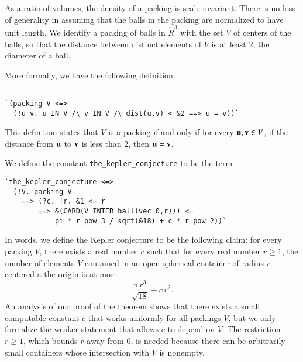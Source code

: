 As a ratio of volumes, the density of a packing is scale invariant.
There is no loss of generality in assuming that the balls in the
packing are normalized to have unit length.  We identify a packing of
balls in $\ring{R}^3$ with the set $V$ of centers of the balls, so
that the distance between distinct elements of $V$ is at least $2$,
the diameter of a ball.

More formally, we have the following definition.

\begin{obeylines}

\begin{verbatim}

`(packing V <=> 
  (!u v. u IN V /\ v IN V /\ dist(u,v) < &2 ==> u = v))`

\end{verbatim}
\end{obeylines}
This definition states that $V$ is a packing if and only if for every
${\mathbf u}, {\mathbf v} \in V$, if the distance from ${\mathbf u}$ to ${\mathbf v}$ is less than $2$,
then ${\mathbf u}={\mathbf v}$.

We define the constant {\tt the\_kepler\_conjecture} to be the term

\begin{obeylines}

\begin{verbatim}
`the_kepler_conjecture <=>
  (!V. packing V
    ==> (?c. !r. &1 <= r
        ==> &(CARD(V INTER ball(vec 0,r))) <=
            pi * r pow 3 / sqrt(&18) + c * r pow 2))`
\end{verbatim}
\end{obeylines}

In words, we define the Kepler conjecture to be the following claim:
for every packing $V$, there exists a real number $c$ such that for
every real number $r\ge 1$, the number of elements $V$ contained in an
open spherical container of radius $r$ centered a the origin is at
most
\[
  \frac{\pi\, r^3}{\sqrt{18}} + c\, r^2.
\]
An analysis of our proof of the theorem shows that there exists a
small computable constant $c$ that works uniformly for all packings
$V$, but we only formalize the weaker statement that allows $c$ to
depend on $V$.  The restriction $r\ge 1$, which bounds $r$ away from
$0$, is needed because there can be arbitrarily small containers whose
intersection with $V$ is nonempty.

